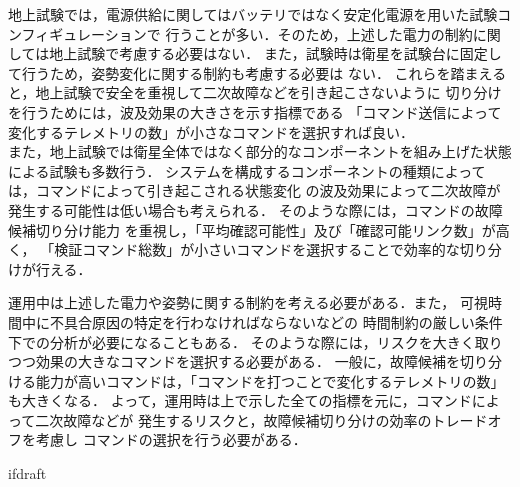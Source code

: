 \documentclass[11pt]{jsreport}
\begin{document}
地上試験では，電源供給に関してはバッテリではなく安定化電源を用いた試験コンフィギュレーションで
行うことが多い．そのため，上述した電力の制約に関しては地上試験で考慮する必要はない．
また，試験時は衛星を試験台に固定して行うため，姿勢変化に関する制約も考慮する必要は
ない．
これらを踏まえると，地上試験で安全を重視して二次故障などを引き起こさないように
切り分けを行うためには，波及効果の大きさを示す指標である
「コマンド送信によって変化するテレメトリの数」が小さなコマンドを選択すれば良い．\\
また，地上試験では衛星全体ではなく部分的なコンポーネントを組み上げた状態による試験も多数行う．
システムを構成するコンポーネントの種類によっては，コマンドによって引き起こされる状態変化
の波及効果によって二次故障が発生する可能性は低い場合も考えられる．
そのような際には，コマンドの故障候補切り分け能力
を重視し，「平均確認可能性」及び「確認可能リンク数」が高く，
「検証コマンド総数」が小さいコマンドを選択することで効率的な切り分けが行える．

運用中は上述した電力や姿勢に関する制約を考える必要がある．また，
可視時間中に不具合原因の特定を行わなければならないなどの
時間制約の厳しい条件下での分析が必要になることもある．
そのような際には，リスクを大きく取りつつ効果の大きなコマンドを選択する必要がある．
一般に，故障候補を切り分ける能力が高いコマンドは，「コマンドを打つことで変化するテレメトリの数」
も大きくなる．
よって，運用時は上で示した全ての指標を元に，コマンドによって二次故障などが
発生するリスクと，故障候補切り分けの効率のトレードオフを考慮し
コマンドの選択を行う必要がある．



\expandafter\ifx\csname ifdraft\endcsname\relax
  
\end{document}
